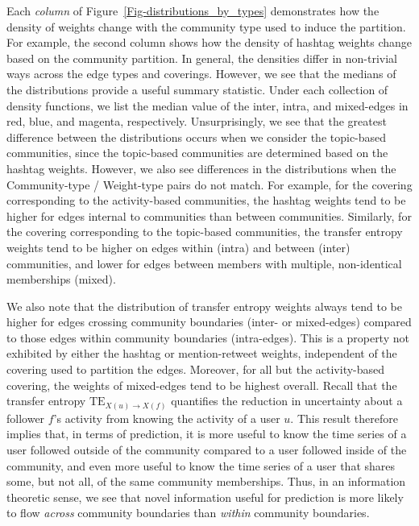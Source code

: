 Each \emph{column} of Figure~\ref{Fig-distributions_by_types} demonstrates how the density of weights change with the community type used to induce the partition. For example, the second column shows how the density of hashtag weights change based on the community partition. In general, the densities differ in non-trivial ways across the edge types and coverings. However, we see that the medians of the distributions provide a useful summary statistic. Under each collection of density functions, we list the median value of the inter, intra, and mixed-edges in red, blue, and magenta, respectively. Unsurprisingly, we see that the greatest difference between the distributions occurs when we consider the topic-based communities, since the topic-based communities are determined based on the hashtag weights. However, we also see differences in the distributions when the Community-type / Weight-type pairs do not match. For example, for the covering corresponding to the activity-based communities, the hashtag weights tend to be higher for edges internal to communities than between communities. Similarly, for the covering corresponding to the topic-based communities, the transfer entropy weights tend to be higher on edges within (intra) and between (inter) communities, and lower for edges between members with multiple, non-identical memberships (mixed).

We also note that the distribution of transfer entropy weights always tend to be higher for edges crossing community boundaries (inter- or mixed-edges) compared to those edges within community boundaries (intra-edges). This is a property not exhibited by either the hashtag or mention-retweet weights, independent of the covering used to partition the edges. Moreover, for all but the activity-based covering, the weights of mixed-edges tend to be highest overall.  Recall that the transfer entropy $\text{TE}_{X(u) \to X(f)}$ quantifies the reduction in uncertainty about a follower $f$'s activity from knowing the activity of a user $u$. This result therefore implies that, in terms of prediction, it is more useful to know the time series of a user followed outside of the community compared to a user followed inside of the community, and even more useful to know the time series of a user that shares some, but not all, of the same community memberships. Thus, in an information theoretic sense, we see that novel information useful for prediction is more likely to flow \emph{across} community boundaries than \emph{within} community boundaries.

